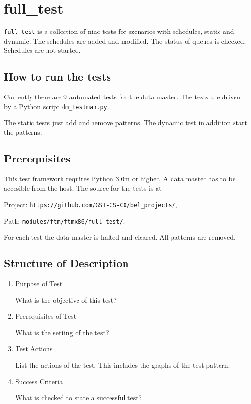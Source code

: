 \section{full\_test}
\texttt{full\_test} is a collection of nine tests for szenarios with schedules, static and dynamic. The schedules are added and modified. The
status of queues is checked. Schedules are not started.
\subsection{How to run the tests}
Currently there are 9 automated tests for the data master. The tests are driven by a Python script \texttt{dm\_testman.py}.

The static tests just add and remove patterns. The dynamic test in addition start the patterns.
\subsection{Prerequisites}
This test framework requires Python 3.6m or higher. A data master has to be accesible from the host. 
The source for the tests is at 

Project: \texttt{https://github.com/GSI-CS-CO/bel\_projects/},

Path: \texttt{modules/ftm/ftmx86/full\_test/}.

For each test the data master is halted and cleared. All patterns are removed.

\subsection{Structure of Description}
\begin{enumerate}
	\item Purpose of Test

	What is the objective of this test?
	\item Prerequisites of Test

	What is the setting of the test?
	\item Test Actions

	List the actions of the test. This includes the graphs of the test pattern.
	\item Success Criteria

	What is checked to state a successful test?
\end{enumerate}
